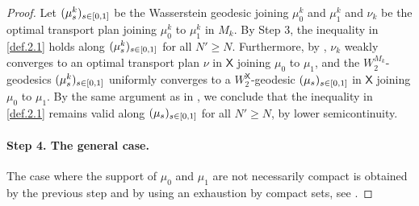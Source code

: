 \documentclass[11pt,twoside,a4paper]{article}
\newcommand{\red}{\color{red}}
\newcommand{\X}{\mathsf{X}}
\theoremstyle{theorem}
\theoremstyle{definition}
\theoremstyle{remark}
\theoremstyle{proof}
\begin{document}
\begin{proof}
    Let $(\mu_s^k)_{s \in \interval{0}{1}}$ be the Wasserstein geodesic joining $\mu_0^k$ and $\mu_1^k$ and $\nu_k$ be the optimal transport plan joining $\mu_0^k$ to $\mu_1^k$ in $M_k$. By Step 3, the inequality in \cref{def.2.1} holds
    along $(\mu_s^k)_{s \in \interval{0}{1}}$ for all $N' \geq N$. Furthermore, by \cite[Theorem 28.9 and Exercise 28.15]{villani}, $\nu_k$ weakly converges to an optimal transport plan $\nu$ in $\X$ joining $\mu_0$ to $\mu_1$, and the $W_2^{M_k}$-geodesics $(\mu_s^k)_{s \in \interval{0}{1}}$ uniformly converges to a $W_2^{\X}$-geodesic $(\mu_s)_{s \in \interval{0}{1}}$ in $\X$ joining $\mu_0$ to $\mu_1$. By the same argument as in \cite[Theorem\, 29.24 and 29.21]{villani}, we conclude that the inequality in \cref{def.2.1} remains valid
    along $(\mu_s)_{s \in \interval{0}{1}}$ for all $N' \geq N$, by lower semicontinuity.

    \paragraph{Step 4. The general case.} The case where the support of $\mu_0$ and $\mu_1$ are not necessarily compact is obtained by the previous step and by using an exhaustion by compact sets, see \cite[Appendix E]{lott--villani2009}.
\end{proof}
\end{document}
